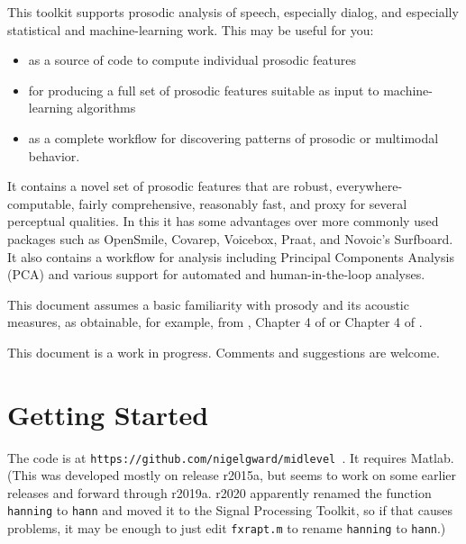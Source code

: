 \documentclass[11pt]{article}
\begin{document}
This toolkit supports prosodic analysis of speech, especially dialog,
and especially statistical and machine-learning work.
This may be useful for you:
\begin{itemize}\setlength{\itemsep}{0pt}\setlength{\parskip}{0pt}
\item as a source of code to compute individual
prosodic features 
\item for producing a full set of prosodic features
suitable as input to machine-learning algorithms 
\item as a complete
workflow for discovering patterns of prosodic or multimodal behavior.
\end{itemize}
It contains a novel set of prosodic features that are robust,
everywhere-computable, fairly comprehensive, reasonably fast, and
proxy for several perceptual qualities.  In this it has some
advantages over more commonly used packages such as OpenSmile,
Covarep, Voicebox, Praat, and Novoic's Surfboard. It also contains a
workflow for analysis including Principal Components Analysis (PCA)
and various support for automated and human-in-the-loop analyses.

This document assumes a basic familiarity with prosody and its
acoustic measures, as obtainable, for example, from \cite{me-cup}, %
Chapter 4 of \cite{ogden-phonetics} or Chapter 4 of
\cite{ladefoged03}.

This document is a work in progress.  Comments and suggestions are
welcome.


\section{Getting Started}  \label{sec:starting}

The code is at {\tt https://github.com/nigelgward/midlevel }.  It requires
 Matlab. (This was developed mostly on release r2015a, but seems to
 work on some earlier releases and forward through r2019a.  r2020
 apparently renamed the function {\tt hanning} to {\tt hann} and moved
 it to the Signal Processing Toolkit, so if that causes problems, it
 may be enough to just edit {\tt fxrapt.m} to rename {\tt hanning} to
 {\tt hann}.)

\end{document}
